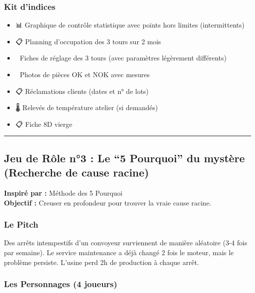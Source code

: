 \documentclass[
]{article}
\providecommand{\tightlist}{%
  \setlength{\itemsep}{0pt}\setlength{\parskip}{0pt}}
\begin{document}
\subsubsection{Kit d'indices}\label{kit-dindices-1}

\begin{itemize}
\tightlist
\item
  📊 Graphique de contrôle statistique avec points hors limites
  (intermittents)
\item
  📋 Planning d'occupation des 3 tours sur 2 mois
\item
  🔧 Fiches de réglage des 3 tours (avec paramètres légèrement
  différents)
\item
  📸 Photos de pièces OK et NOK avec mesures
\item
  📋 Réclamations clients (dates et n° de lots)
\item
  🌡️ Relevés de température atelier (si demandés)
\item
  📋 Fiche 8D vierge
\end{itemize}

\begin{center}\rule{0.5\linewidth}{0.5pt}\end{center}

\subsection{Jeu de Rôle n°3 : Le ``5 Pourquoi'' du mystère (Recherche de
cause
racine)}\label{jeu-de-ruxf4le-n3-le-5-pourquoi-du-mystuxe8re-recherche-de-cause-racine}

\textbf{Inspiré par :} Méthode des 5 Pourquoi\\
\textbf{Objectif :} Creuser en profondeur pour trouver la vraie cause
racine.

\subsubsection{Le Pitch}\label{le-pitch-2}

Des arrêts intempestifs d'un convoyeur surviennent de manière aléatoire
(3-4 fois par semaine). Le service maintenance a déjà changé 2 fois le
moteur, mais le problème persiste. L'usine perd 2h de production à
chaque arrêt.

\subsubsection{Les Personnages (4
joueurs)}\label{les-personnages-4-joueurs-1}
\end{document}
